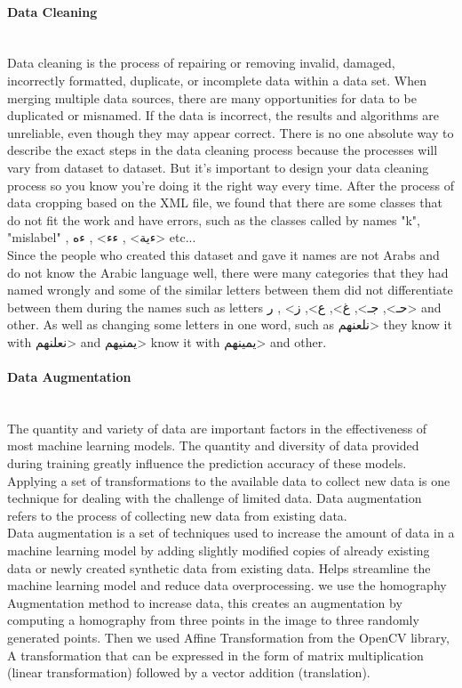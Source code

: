\paragraph{Data Cleaning}\mbox{}\\
Data cleaning is the process of repairing or removing invalid, damaged, incorrectly formatted, duplicate, or incomplete data within a data set. When merging multiple data sources, there are many opportunities for data to be duplicated or misnamed. If the data is incorrect, the results and algorithms are unreliable, even though they may appear correct. There is no one absolute way to describe the exact steps in the data cleaning process because the processes will vary from dataset to dataset. But it's important to design your data cleaning process so you know you're doing it the right way every time.
After the process of data cropping based on the XML file, we found that there are some classes that do not fit the work and have errors, such as the classes called by names "k", "mislabel" , \<ءية> , \<ءء> , \<ءه> etc...\\


Since the people who created this dataset and gave it names are not Arabs and do not know the Arabic language well, there were many categories that they had named wrongly and some of the similar letters between them did not differentiate between them during the names such as letters \<حـ>, \<جـ>, \<غ>, \<ع>, \<ز> , \<ر> and other.
As well as changing some letters in one word, such as \<نلعنهم> they know it with \<نعلنهم> and \<يمنيهم> know it with \<يمينهم> and other.

\paragraph{Data Augmentation}\mbox{}\\

\noindent
The quantity and variety of data are important factors in the effectiveness of most machine learning models. The quantity and diversity of data provided during training greatly influence the prediction accuracy of these models.
Applying a set of transformations to the available data to collect new data is one technique for dealing with the challenge of limited data. Data augmentation refers to the process of collecting new data from existing data.\\

Data augmentation is a set of techniques used to increase the amount of data in a machine learning model by adding slightly modified copies of already existing data or newly created synthetic data from existing data. Helps streamline the machine learning model and reduce data overprocessing.
we use the homography Augmentation method to increase data, this creates an augmentation by computing a homography from three points in the image to three randomly generated points.
Then we used Affine Transformation from the OpenCV library, A transformation that can be expressed in the form of matrix multiplication (linear transformation) followed by a vector addition (translation).

